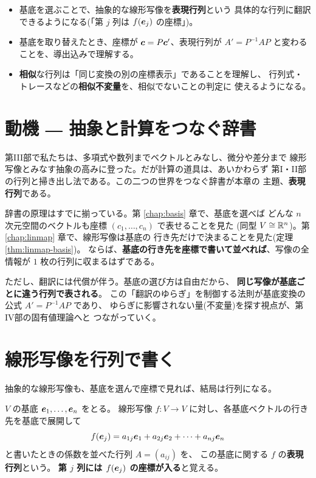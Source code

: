 \begin{goal}
\begin{itemize}
\item 基底を選ぶことで、抽象的な線形写像を\textbf{表現行列}という
具体的な行列に翻訳できるようになる(「第 $j$ 列は
$f(\bm{e}_j)$ の座標」)。
\item 基底を取り替えたとき、座標が $\bm{c} = P\bm{c}'$、表現行列が
$A' = P^{-1}AP$ と変わることを、導出込みで理解する。
\item \textbf{相似}な行列は「同じ変換の別の座標表示」であることを理解し、
行列式・トレースなどの\textbf{相似不変量}を、相似でないことの判定に
使えるようになる。
\end{itemize}
\end{goal}

\section{動機 ― 抽象と計算をつなぐ辞書}

第III部で私たちは、多項式や数列までベクトルとみなし、微分や差分まで
線形写像とみなす抽象の高みに登った。だが計算の道具は、あいかわらず
第I・II部の行列と掃き出し法である。この二つの世界をつなぐ辞書が本章の
主題、\textbf{表現行列}である。

辞書の原理はすでに揃っている。第 \ref{chap:basis} 章で、基底を選べば
どんな $n$ 次元空間のベクトルも座標 $(c_1, \dots, c_n)$ で表せることを見た
(同型 $V \cong \mathbb{R}^n$)。第 \ref{chap:linmap} 章で、線形写像は基底の
行き先だけで決まることを見た(定理 \ref{thm:linmap-basis})。
ならば、\textbf{基底の行き先を座標で書いて並べれば}、写像の全情報が
$1$ 枚の行列に収まるはずである。

ただし、翻訳には代償が伴う。基底の選び方は自由だから、
\textbf{同じ写像が基底ごとに違う行列で表される}。
この「翻訳のゆらぎ」を制御する法則が基底変換の公式 $A' = P^{-1}AP$ であり、
ゆらぎに影響されない量(不変量)を探す視点が、第IV部の固有値理論へと
つながっていく。

\section{線形写像を行列で書く}

抽象的な線形写像も、基底を選んで座標で見れば、結局は行列になる。

\begin{teigi}[表現行列]
$V$ の基底 $\bm{e}_1, \dots, \bm{e}_n$ をとる。
線形写像 $f : V \to V$ に対し、各基底ベクトルの行き先を基底で展開して
\[
f(\bm{e}_j) = a_{1j}\bm{e}_1 + a_{2j}\bm{e}_2 + \cdots + a_{nj}\bm{e}_n
\]
と書いたときの係数を並べた行列 $A = (a_{ij})$ を、
この基底に関する $f$ の\textbf{表現行列}という。
\textbf{第 $j$ 列には $f(\bm{e}_j)$ の座標が入る}と覚える。
\end{teigi}

